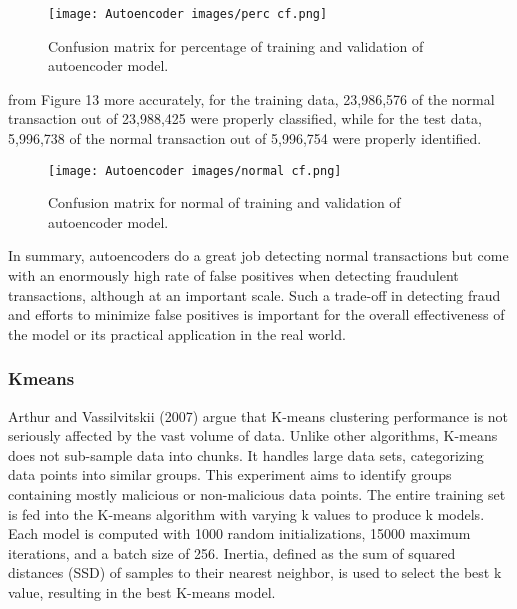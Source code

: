 \documentclass[journal]{IEEEtran}
\begin{document}
\begin{figure}[h!] %
    \centering
    \texttt{[image: Autoencoder images/perc cf.png]}  %
    \caption{Confusion matrix for percentage of training and validation of autoencoder model.}
    \label{fig:autoencoder-structure}
\end{figure}

from Figure 13 more accurately, for the training data, 23,986,576 of the normal transaction out of 23,988,425 were properly classified, while for the test data, 5,996,738 of the normal transaction out of 5,996,754 were properly identified. 

\begin{figure}[h!] %
    \centering
    \texttt{[image: Autoencoder images/normal cf.png]}  %
    \caption{Confusion matrix for normal of training and validation of autoencoder model.}
    \label{fig:autoencoder-structure}
\end{figure}

In summary, autoencoders do a great job detecting normal transactions but come with an enormously high rate of false positives when detecting fraudulent transactions, although at an important scale. Such a trade-off in detecting fraud and efforts to minimize false positives is important for the overall effectiveness of the model or its practical application in the real world. 

\subsubsection{Kmeans}

Arthur and Vassilvitskii (2007) argue that K-means clustering performance is not seriously affected by the vast volume of data. Unlike other algorithms, K-means does not sub-sample data into chunks. It handles large data sets, categorizing data points into similar groups. This experiment aims to identify groups containing mostly malicious or non-malicious data points. The entire training set is fed into the K-means algorithm with varying k values to produce k models. Each model is computed with 1000 random initializations, 15000 maximum iterations, and a batch size of 256. Inertia, defined as the sum of squared distances (SSD) of samples to their nearest neighbor, is used to select the best k value, resulting in the best K-means model.
\end{document}

